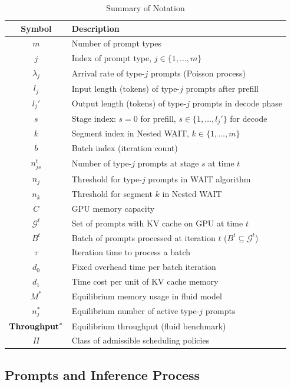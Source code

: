 \begin{table}[h]
\centering
\caption{Summary of Notation}
\label{tab:notation}
\small
\begin{tabular}{cl}
\toprule
\textbf{Symbol} & \textbf{Description} \\
\midrule
$m$ & Number of prompt types \\
$j$ & Index of prompt type, $j \in \{1, \dots, m\}$ \\
$\lambda_j$ & Arrival rate of type-$j$ prompts (Poisson process) \\
$l_j$ & Input length (tokens) of type-$j$ prompts after prefill \\
$l_j'$ & Output length (tokens) of type-$j$ prompts in decode phase \\
$s$ & Stage index: $s = 0$ for prefill, $s \in \{1, \dots, l_j'\}$ for decode \\
$k$ & Segment index in Nested WAIT, $k \in \{1, \dots, m\}$ \\
$b$ & Batch index (iteration count) \\
$n_{js}^t$ & Number of type-$j$ prompts at stage $s$ at time $t$ \\
$n_j$ & Threshold for type-$j$ prompts in WAIT algorithm \\
$n_k$ & Threshold for segment $k$ in Nested WAIT \\
\midrule
$C$ & GPU memory capacity \\
$\mathcal{G}^t$ & Set of prompts with KV cache on GPU at time $t$ \\
$B^t$ & Batch of prompts processed at iteration $t$ ($B^t \subseteq \mathcal{G}^t$) \\
$\tau$ & Iteration time to process a batch \\
$d_0$ & Fixed overhead time per batch iteration \\
$d_1$ & Time cost per unit of KV cache memory \\
\midrule
$M^*$ & Equilibrium memory usage in fluid model \\
$n_j^*$ & Equilibrium number of active type-$j$ prompts \\
$\textbf{Throughput}^*$ & Equilibrium throughput (fluid benchmark) \\
$\Pi$ & Class of admissible scheduling policies \\
\bottomrule
\end{tabular}
\end{table}

\subsection{Prompts and Inference Process}

